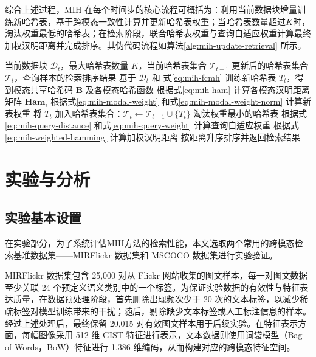 综合上述过程，MIH 在每个时间步的核心流程可概括为：利用当前数据块增量训练新哈希表，基于跨模态一致性计算并更新哈希表权重；当哈希表数量超过$K$时，淘汰权重最低的哈希表；在检索阶段，联合哈希表权重与查询自适应权重计算最终加权汉明距离并完成排序。其伪代码流程如算法\ref{alg:mih-update-retrieval} 所示。

\vspace{0.3\baselineskip}
\begingroup
\setlength{\intextsep}{4pt}
\begin{algorithm}[H]
  \caption{时间步 $t$ 的 MIH 训练与检索流程}
  \label{alg:mih-update-retrieval}
  \begin{algorithmic}[1]
    \REQUIRE 当前数据块 $\mathcal{D}_t$，最大哈希表数量 $K$，当前哈希表集合 $\mathcal{T}_{t-1}$
    \ENSURE 更新后的哈希表集合 $\mathcal{T}_{t}$，查询样本的检索排序结果
    \STATE 基于 $\mathcal{D}_t$ 和 式\eqref{eq:mih-fcmh} 训练新哈希表 $T_t$，得到模态共享哈希码 $\mathbf{B}$ 及各模态哈希函数
    \STATE 根据式\eqref{eq:mih-ham} 计算各模态汉明距离矩阵 $\mathbf{Ham}_i$
    \STATE 根据式\eqref{eq:mih-modal-weight} 和式\eqref{eq:mih-modal-weight-norm} 计算新表权重
    \STATE 将 $T_t$ 加入哈希表集合：$\mathcal{T}_{t} \leftarrow \mathcal{T}_{t-1} \cup \{T_t\}$
      \STATE 淘汰权重最小的哈希表
    \ENDIF
      \STATE 根据式\eqref{eq:mih-query-distance} 和式\eqref{eq:mih-query-weight} 计算查询自适应权重
      \STATE 根据式\eqref{eq:mih-weighted-hamming} 计算加权汉明距离
      \STATE 按距离升序排序并返回检索结果
    \ENDFOR
  \end{algorithmic}
\end{algorithm}
\endgroup

\section{实验与分析}
\subsection{实验基本设置}
在实验部分，为了系统评估MIH方法的检索性能，本文选取两个常用的跨模态检索基准数据集——MIRFlickr 数据集和 MSCOCO 数据集进行实验验证。

MIRFlickr 数据集包含 25,000 对从 Flickr 网站收集的图文样本，每一对图文数据至少关联 24 个预定义语义类别中的一个标签。为保证实验数据的有效性与特征表达质量，在数据预处理阶段，首先删除出现频次少于 20 次的文本标签，以减少稀疏标签对模型训练带来的干扰；随后，剔除缺少文本标签或人工标注信息的样本。经过上述处理后，最终保留 20,015 对有效图文样本用于后续实验。在特征表示方面，每幅图像采用 512 维 GIST 特征进行表示，文本数据则使用词袋模型（Bag-of-Words，BoW）特征进行 1,386 维编码，从而构建对应的跨模态特征空间。

